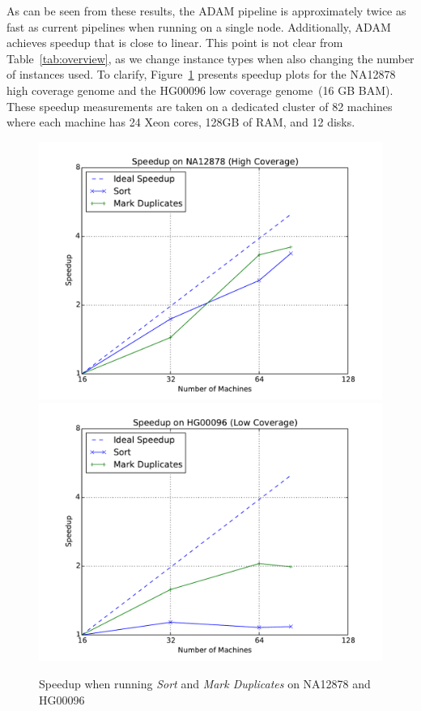 \documentclass{acm_proc_article-sp}
\begin{document}
As can be seen from these results, the ADAM pipeline is approximately twice as fast as current pipelines
when running on a single node. Additionally, ADAM achieves speedup that is close to linear. This point is
not clear from Table~\ref{tab:overview}, as we change instance types when also changing the number of
instances used. To clarify, Figure~\ref{fig:speedup} presents speedup plots for the NA12878 high
coverage genome and the HG00096 low coverage genome~(16 GB BAM). These speedup
measurements are taken on a dedicated cluster of 82 machines where each machine has 24 Xeon
cores, 128GB of RAM, and 12 disks.

\begin{figure}[h]
\begin{center}
\includegraphics[width=0.99\linewidth]{graphs/speedup_na12878.pdf}
\includegraphics[width=0.99\linewidth]{graphs/speedup_hg00096.pdf}
\end{center}
\caption{Speedup when running \textit{Sort} and \textit{Mark Duplicates} on NA12878 and HG00096}
\label{fig:speedup}
\end{figure}
\end{document}
